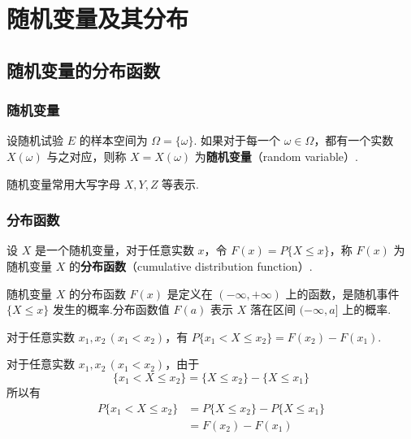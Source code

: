 
\chapter{随机变量及其分布}

\section{随机变量的分布函数}

\subsection{随机变量}

\begin{definition}
    设随机试验 $E$ 的样本空间为 $\varOmega=\{\omega\}$. 如果对于每一个 $\omega\in\varOmega$，都有一个实数 $X(\omega)$ 与之对应，则称 $X=X(\omega)$ 为\textbf{随机变量}（random variable）.
\end{definition}

随机变量常用大写字母 $X,Y,Z$ 等表示.

\subsection{分布函数}

\begin{definition}
    设 $X$ 是一个随机变量，对于任意实数 $x$，令 $F(x)=P\{X \leqslant x\}$，称 $F(x)$ 为随机变量 $X$ 的\textbf{分布函数}（cumulative distribution function）.
\end{definition}

随机变量 $X$ 的分布函数 $F(x)$ 是定义在 $(-\infty,+\infty)$ 上的函数，是随机事件 $\{X \leqslant x\}$ 发生的概率.分布函数值 $F(a)$ 表示 $X$ 落在区间 $(-\infty,a]$ 上的概率.

\setcounter{propertyname}{0}

\begin{property}
    对于任意实数 $x_1,x_2\, (x_1<x_2)$，有 $P\{x_1 < X \leqslant x_2\}=F(x_2)-F(x_1)$.
\end{property}

\begin{myproof}
    对于任意实数 $x_1,x_2\, (x_1<x_2)$，由于
    $$
    \{x_1 < X \leqslant x_2\} = \{X \leqslant x_2\} - \{X \leqslant x_1\}
    $$
    所以有
    $$
    \begin{aligned}
        P\{x_1 < X \leqslant x_2\} &= P\{X \leqslant x_2\} - P\{X \leqslant x_1\}\\
        &= F(x_2)-F(x_1)
    \end{aligned}
    $$
\end{myproof}

